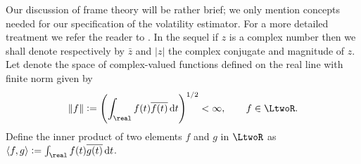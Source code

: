 \documentclass[a4paper, 12pt,preprint]{article}
\renewcommand{\D}{\ensuremath{\dif}\xspace}
\begin{document}
Our discussion of  frame theory will be  rather brief; we only mention concepts needed for our specification of the volatility estimator.  For a  more detailed treatment we refer the reader to  \citep{Christensen2008}. 
In the sequel if $z$ is a complex number then we shall denote respectively by $\bar{z}$ and $\vert z \vert$ the complex conjugate and magnitude of $z$. Let \LtwoR denote the space of complex-valued functions defined on the real line with finite norm given by 
\begin{align}
  \Vert f \Vert := \left(\int_\real f(t) \overline{f(t)} \D t\right)^{1/2} < \infty, \qquad  f \in \LtwoR.\notag
  \label{}
\end{align}
 Define the  inner product of two elements $f$ and $g$ in $\LtwoR$ as $\langle f,g\rangle :=  \int_\real f(t) \overline{g(t)} \D t$.
\end{document}
